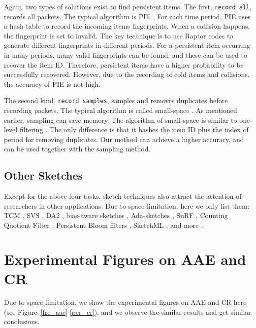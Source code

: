 Again, two types of solutions exist to find persistent items. The first, \texttt{record all}, records all packets. The typical algorithm is PIE \cite{persisitem}. 
%
For each time period, PIE uses a hash table to record the incoming items fingerprints. When a collision happens, the fingerprint is set to invalid.
%
The key technique is to use Raptor codes \cite{raptorcode} to generate different fingerprints in different periods.
%
For a persistent item occurring in many periods, many valid fingerprints can be found, and these can be used to recover the item ID.
%
Therefore, persistent items have a higher probability to be successfully recovered.
%
However, due to the recording of cold items and collisions, the accuracy of PIE is not high.

The second kind, \texttt{record samples}, samples and removes duplicates before recording packets. 
%
The typical algorithm is called small-space \cite{smallspace}. 
%
As mentioned earlier, sampling can save memory.
%
The algorithm of small-space is similar to one-level filtering \cite{superspreader}.
%
The only difference is that it 
hashes the item ID plus the index of period for removing duplicates.
%
Our method can achieve a higher accuracy, and can be used together with the sampling method.

\presub
\subsection{Other Sketches} \postsub
Except for the above four tasks, sketch techniques also attract the attention of researchers in other applications. 
Due to space limitation, here we only list them: TCM \cite{tang2016graph}, SVS \cite{SVS},
DA2 \cite{DA}, bias-aware sketches \cite{bias-aware-sketch}, Ada-sketches \cite{ada-sketch}, SuRF \cite{surf}, Counting Quotient Filter \cite{general-purpose-counting-filter},
Persistent Bloom filters \cite{persistent-bf}, SketchML \cite{sketchml}, and more \cite{wmsketch, cormode2011synopses}.

\section{Experimental Figures on AAE and CR}
\label{app:fig}
Due to space limitation, we show the experimental figures on AAE and CR here (see Figure~\ref{fre_aae}-\ref{per_cr}), and we observe the similar results and get similar conclusions.

